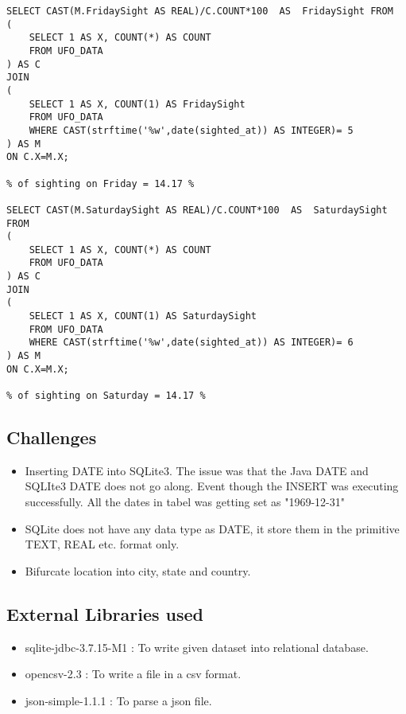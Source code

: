 \documentclass{article}
\begin{document}
\begin{itemize}
\begin{BVerbatim}
SELECT CAST(M.FridaySight AS REAL)/C.COUNT*100  AS  FridaySight FROM 
(
	SELECT 1 AS X, COUNT(*) AS COUNT 
	FROM UFO_DATA
) AS C
JOIN 
(
	SELECT 1 AS X, COUNT(1) AS FridaySight 
	FROM UFO_DATA 
	WHERE CAST(strftime('%
) AS M 
ON C.X=M.X;


SELECT CAST(M.SaturdaySight AS REAL)/C.COUNT*100  AS  SaturdaySight FROM 
(
	SELECT 1 AS X, COUNT(*) AS COUNT 
	FROM UFO_DATA
) AS C
JOIN 
(
	SELECT 1 AS X, COUNT(1) AS SaturdaySight 
	FROM UFO_DATA 
	WHERE CAST(strftime('%
) AS M 
ON C.X=M.X;

\end{BVerbatim}
\end{itemize}	

\subsection*{Challenges}
\begin{itemize}
	\renewcommand{\labelitemi}{$\bullet$}
	\item Inserting DATE into SQLite3. The issue was that the Java DATE and SQLIte3 DATE does not go along. Event though the INSERT was executing successfully. All the dates in tabel was getting set as "1969-12-31"
	\item SQLite does not have any data type as DATE, it store them in the primitive TEXT, REAL etc. format only.
	\item Bifurcate location into city, state and country. 



\end{itemize}
\subsection*{External Libraries used}
\begin{itemize}
	\renewcommand{\labelitemi}{$\bullet$}
	\item sqlite-jdbc-3.7.15-M1 : To write given dataset into relational database. 
	\item opencsv-2.3 : To write a file in a csv format.
	\item json-simple-1.1.1 : To parse a json file.
\end{itemize}	
\end{document}
